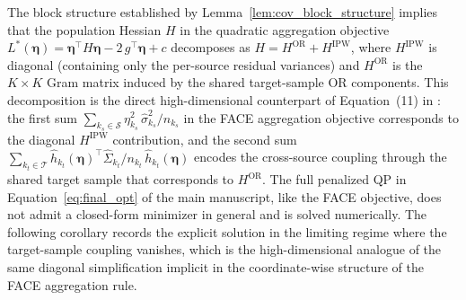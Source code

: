 \documentclass{article}
\begin{document}
The block structure established by Lemma~\ref{lem:cov_block_structure} implies that the population Hessian $H$ in the quadratic aggregation objective $L^*(\boldsymbol{\eta})=\boldsymbol{\eta}^\top H\boldsymbol{\eta}-2\,g^\top\boldsymbol{\eta}+c$ decomposes as $H=H^{\mathrm{OR}}+H^{\mathrm{IPW}}$, where $H^{\mathrm{IPW}}$ is diagonal (containing only the per-source residual variances) and $H^{\mathrm{OR}}$ is the $K\times K$ Gram matrix induced by the shared target-sample OR components. This decomposition is the direct high-dimensional counterpart of Equation~(11) in \citet{han2025federated}: the first sum $\sum_{k_s\in\mathcal{S}}\eta_{k_s}^2\,\widehat{\sigma}^2_{k_s}/n_{k_s}$ in the FACE aggregation objective corresponds to the diagonal $H^{\mathrm{IPW}}$ contribution, and the second sum $\sum_{k_t\in\mathcal{T}}\widehat{h}_{k_t}(\boldsymbol{\eta})^\top\widehat{\Sigma}_{k_t}/n_{k_t}\,\widehat{h}_{k_t}(\boldsymbol{\eta})$ encodes the cross-source coupling through the shared target sample that corresponds to $H^{\mathrm{OR}}$. The full penalized QP in Equation~\eqref{eq:final_opt} of the main manuscript, like the FACE objective, does not admit a closed-form minimizer in general and is solved numerically. The following corollary records the explicit solution in the limiting regime where the target-sample coupling vanishes, which is the high-dimensional analogue of the same diagonal simplification implicit in the coordinate-wise structure of the FACE aggregation rule.
\end{document}
